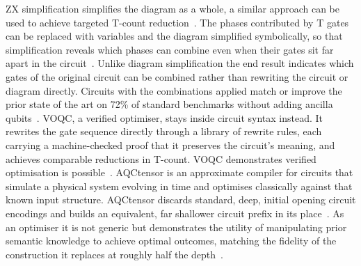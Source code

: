 ZX simplification simplifies the diagram as a whole, a similar approach can be used to achieve targeted T-count reduction~\cite{reducingtcount2019}.
The phases contributed by T gates can be replaced with variables and the diagram simplified symbolically, so that simplification reveals which phases can combine even when their gates sit far apart in the circuit~\cite{reducingtcount2019}.
Unlike diagram simplification the end result indicates which gates of the original circuit can be combined rather than rewriting the circuit or diagram directly.
Circuits with the combinations applied match or improve the prior state of the art on 72\% of standard benchmarks without adding ancilla qubits~\cite{reducingtcount2019}.
VOQC, a verified optimiser, stays inside circuit syntax instead.
It rewrites the gate sequence directly through a library of rewrite rules, each carrying a machine-checked proof that it preserves the circuit's meaning, and achieves comparable reductions in T-count.
VOQC demonstrates verified optimisation is possible~\cite{hietala2023voqc}.
AQCtensor is an approximate compiler for circuits that simulate a physical system evolving in time and optimises classically against that known input structure.
AQCtensor discards standard, deep, initial opening circuit encodings and builds an equivalent, far shallower circuit prefix in its place~\cite{AQCtensor2024}.
As an optimiser it is not generic but demonstrates the utility of manipulating prior semantic knowledge to achieve optimal outcomes, matching the fidelity of the construction it replaces at roughly half the depth~\cite{AQCtensor2024}.

